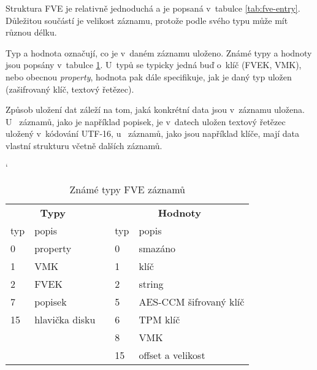 Struktura FVE je relativně jednoduchá a je popsaná v~tabulce \ref{tab:fve-entry}. Důležitou součástí je velikost záznamu, protože podle svého typu může mít různou délku.\cite{Kumar2008,Metz2011}


Typ a hodnota označují, co je v~daném záznamu uloženo. Známé typy a hodnoty jsou popsány v~tabulce \ref{tab:fve-entry-types}. U~typů se typicky jedná buď o~klíč (FVEK, VMK), nebo obecnou \emph{property}, hodnota pak dále specifikuje, jak je daný typ uložen (zašifrovaný klíč, textový řetězec).

Způsob uložení dat záleží na tom, jaká konkrétní data jsou v~záznamu uložena. U~ záznamů, jako je například popisek, je v~datech uložen textový řetězec uložený v~kódování UTF-16, u~ záznamů, jako jsou například klíče, mají data vlastní strukturu včetně dalších záznamů.

\begin{table}[h]
\catcode`
\captionsetup{width=0.65\linewidth}
\caption{Známé typy FVE záznamů}
\label{tab:fve-entry-types}
\begin{center}
\centering
\begin{tabular}{|l|l|c|l|l|}
  \cline{1-2} \cline{4-5}
   \multicolumn{2}{|c|}{\textbf{Typy}} &  & \multicolumn{2}{|c|}{\textbf{Hodnoty}} \\ \cline{1-2} \cline{4-5}
   typ & popis &  & typ & popis \\ \cline{1-2} \cline{4-5}
   0 & property & & 0 & smazáno \\ \cline{1-2} \cline{4-5}
   1 & VMK & & 1 & klíč \\ \cline{1-2} \cline{4-5}
   2 & FVEK & & 2 & string \\ \cline{1-2} \cline{4-5}
   7 & popisek & & 5 & AES-CCM šifrovaný klíč \\ \cline{1-2} \cline{4-5}
   15 & hlavička disku\footnotemark & & 6 & TPM klíč \\ \cline{1-2} \cline{4-5}
   \multicolumn{2}{c}{} & & 8 & VMK \\ \cline{4-5}
   \multicolumn{2}{c}{} & & 15 & offset a velikost \\ \cline{4-5}
   

\end{tabular}
\end{center}
\end{table}

